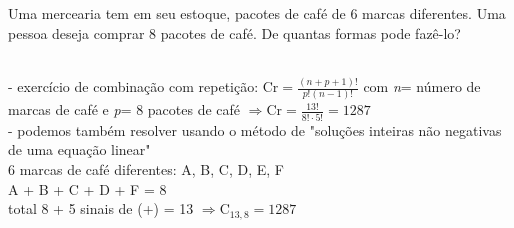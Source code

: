 \begin{ex}
 	Uma mercearia tem em seu estoque, pacotes de café de 6 marcas diferentes. Uma pessoa deseja comprar 8 pacotes de café. De quantas formas pode fazê-lo?   
 	   \begin{sol}
 	     \phantom{A} \\
 	     - exercício de combinação com repetição: $\mathrm{Cr}=\frac{(n+p+1)!}{p!(n-1)!}$ com \textit{n}= número de marcas de café e \textit{p}= 8 pacotes de café 
 	     $\Longrightarrow \mathrm{Cr}=\frac{13!}{8!\cdot5!}=1287$ \\
 	     - podemos também resolver usando o método de "soluções inteiras não negativas de uma equação linear" \\
 	     6 marcas de café diferentes: A, B, C, D, E, F \\
 	     A + B + C + D + F = 8 \\
 	     total 8 + 5 sinais de (+) = 13 $\Longrightarrow \mathrm{C}_{{13},8}=1287$
 	     
 	   \end{sol}
\end{ex}